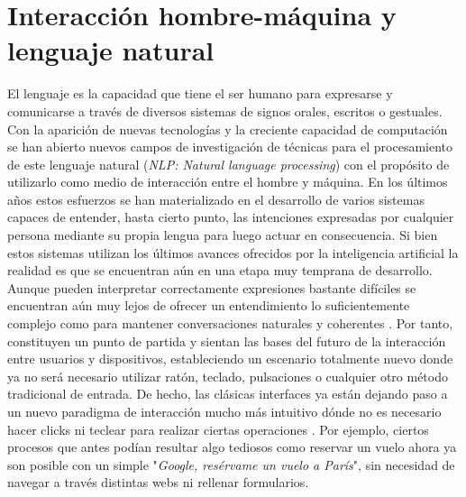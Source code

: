 \section{Interacción hombre-máquina y lenguaje natural}

El lenguaje es la capacidad que tiene el ser humano para expresarse y comunicarse a través de diversos sistemas de signos orales, escritos o gestuales. Con la aparición de nuevas tecnologías y la creciente capacidad de computación se han abierto nuevos campos de investigación de técnicas para el procesamiento de este lenguaje natural (\textit{NLP: Natural language processing}) con el propósito de utilizarlo como medio de interacción entre el hombre y máquina. En los últimos años estos esfuerzos se han materializado en el desarrollo de varios sistemas capaces de entender, hasta cierto punto, las intenciones expresadas por cualquier persona mediante su propia lengua para luego actuar en consecuencia. Si bien estos sistemas utilizan los últimos avances ofrecidos por la inteligencia artificial la realidad es que se encuentran aún en una etapa muy temprana de desarrollo. Aunque pueden interpretar correctamente expresiones bastante difíciles se encuentran aún muy lejos de ofrecer un entendimiento lo suficientemente complejo como para mantener conversaciones naturales y coherentes \cite{designTechniques}. Por tanto, constituyen un punto de partida y sientan las bases del futuro de la interacción entre usuarios y dispositivos, estableciendo un escenario totalmente nuevo donde ya no será necesario utilizar ratón, teclado, pulsaciones o cualquier otro método tradicional de entrada. De hecho, las clásicas interfaces ya están dejando paso a un nuevo paradigma de interacción mucho más intuitivo dónde no es necesario hacer clicks ni teclear para realizar ciertas operaciones \cite{conversationSystems}. Por ejemplo, ciertos procesos que antes podían resultar algo tediosos como reservar un vuelo ahora ya son posible con un simple "\textit{Google, resérvame un vuelo a París}", sin necesidad de navegar a través distintas webs ni rellenar formularios.\\

